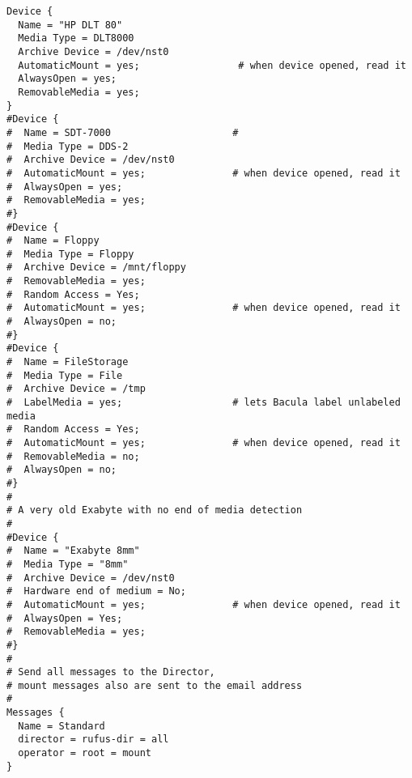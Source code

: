 \begin{verbatim}
Device {
  Name = "HP DLT 80"
  Media Type = DLT8000
  Archive Device = /dev/nst0
  AutomaticMount = yes;                 # when device opened, read it
  AlwaysOpen = yes;
  RemovableMedia = yes;
}
#Device {
#  Name = SDT-7000                     #
#  Media Type = DDS-2
#  Archive Device = /dev/nst0
#  AutomaticMount = yes;               # when device opened, read it
#  AlwaysOpen = yes;
#  RemovableMedia = yes;
#}
#Device {
#  Name = Floppy
#  Media Type = Floppy
#  Archive Device = /mnt/floppy
#  RemovableMedia = yes;
#  Random Access = Yes;
#  AutomaticMount = yes;               # when device opened, read it
#  AlwaysOpen = no;
#}
#Device {
#  Name = FileStorage
#  Media Type = File
#  Archive Device = /tmp
#  LabelMedia = yes;                   # lets Bacula label unlabeled media
#  Random Access = Yes;
#  AutomaticMount = yes;               # when device opened, read it
#  RemovableMedia = no;
#  AlwaysOpen = no;
#}
#
# A very old Exabyte with no end of media detection
#
#Device {
#  Name = "Exabyte 8mm"
#  Media Type = "8mm"
#  Archive Device = /dev/nst0
#  Hardware end of medium = No;
#  AutomaticMount = yes;               # when device opened, read it
#  AlwaysOpen = Yes;
#  RemovableMedia = yes;
#}
#
# Send all messages to the Director,
# mount messages also are sent to the email address
#
Messages {
  Name = Standard
  director = rufus-dir = all
  operator = root = mount
}
\end{verbatim}
\normalsize
